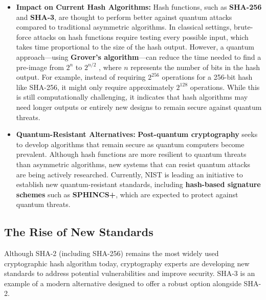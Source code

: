 \documentclass[11pt,a4paper]{article}
\begin{document}
    \begin{itemize}
        \item \textbf{Impact on Current Hash Algorithms:} Hash functions, such as \textbf{SHA-256} and \textbf{SHA-3}, are thought to perform better against quantum attacks compared to traditional asymmetric algorithms. In classical settings, brute-force attacks on hash functions require testing every possible input, which takes time proportional to the size of the hash output. However, a quantum approach—using \textbf{Grover's algorithm}—can reduce the time needed to find a pre-image from $2^n$ to $2^{n/2}$ , where $n$ represents the number of bits in the hash output. For example, instead of requiring $2^{256}$ operations for a 256-bit hash like SHA-256, it might only require approximately $2^{128}$ operations. While this is still computationally challenging, it indicates that hash algorithms may need longer outputs or entirely new designs to remain secure against quantum threats.

        \item \textbf{Quantum-Resistant Alternatives:} \textbf{Post-quantum cryptography} seeks to develop algorithms that remain secure as quantum computers become prevalent. Although hash functions are more resilient to quantum threats than asymmetric algorithms, new systems that can resist quantum attacks are being actively researched. Currently, NIST is leading an initiative to establish new quantum-resistant standards, including \textbf{hash-based signature schemes} such as \textbf{SPHINCS+}, which are expected to protect against quantum threats.

    \end{itemize}

    \subsection*{The Rise of New Standards}
    Although SHA-2 (including SHA-256) remains the most widely used cryptographic hash algorithm today, cryptography experts are developing new standards to address potential vulnerabilities and improve security. SHA-3 is an example of a modern alternative designed to offer a robust option alongside SHA-2.
\end{document}
